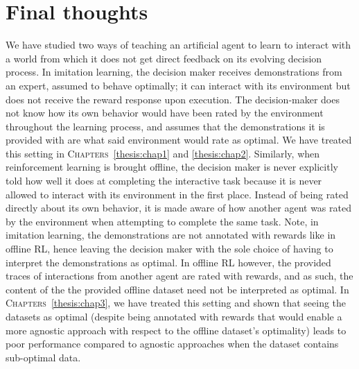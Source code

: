 

\chapter[Final thoughts]{Final thoughts}
\label{thesis:final}

We have studied two ways of teaching an artificial agent to learn to interact with a world from
which it does not get direct feedback on its evolving decision process.
In imitation learning, the decision maker receives demonstrations from an expert, assumed to behave optimally;
it can interact with its environment but does not receive the reward response upon execution.
The decision-maker does not know how its own behavior would have been rated by the environment throughout the
learning process, and assumes that the demonstrations it is provided with are what said environment would
rate as optimal. We have treated this setting in \textsc{Chapters}~\ref{thesis:chap1} and \ref{thesis:chap2}.
Similarly, when reinforcement learning is brought offline, the decision maker is never explicitly
told how well it does at completing the interactive task because it is never allowed to interact with its
environment in the first place.
Instead of being rated directly about its own behavior, it is made aware of
how another agent was rated by the environment when attempting to complete the same task.
Note, in imitation learning, the demonstrations are not annotated with rewards like in offline RL,
hence leaving the decision maker with the sole choice of having to interpret the demonstrations as optimal.
In offline RL however, the provided traces of interactions from another agent are rated with rewards,
and as such, the content of the the provided offline dataset need not be interpreted as optimal.
In \textsc{Chapters}~\ref{thesis:chap3}, we have treated this setting and
shown that seeing the datasets as optimal
(despite being annotated with rewards that would enable a more agnostic approach with respect to the
offline dataset's optimality) leads to poor performance compared to agnostic approaches
when the dataset contains sub-optimal data.

